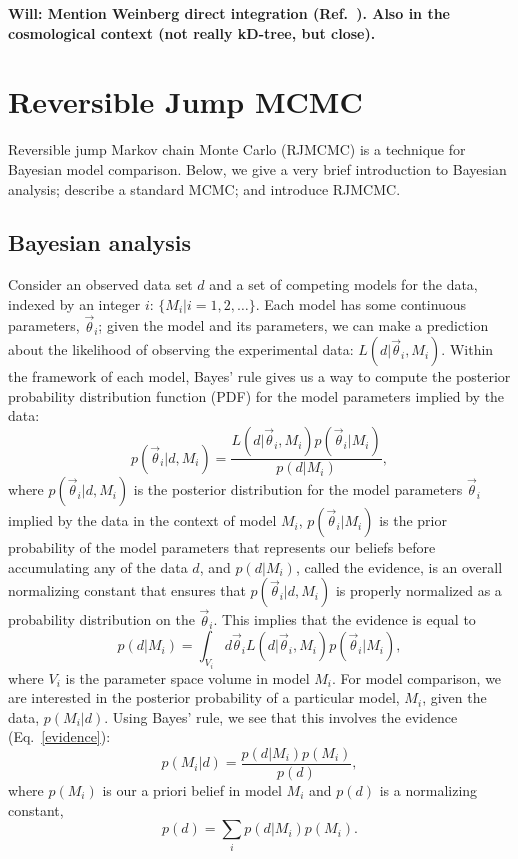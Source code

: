 \documentclass[prd,preprint]{revtex4}
\newcommand{\vtheta}{\vec{\theta}}
\newcommand{\be}{\begin{equation}}
\newcommand{\ee}{\end{equation}}
\newcommand{\bel}[1]{\begin{equation}\label{#1}}
\newcommand{\will}[1]{{\color{blue} \bf Will: #1}}
\begin{document}
\will{Mention Weinberg direct integration (Ref.~\cite{Weinberg2009}).
  Also \cite{Ascasibar2005} in the cosmological context (not really
  kD-tree, but close).}

\section{Reversible Jump MCMC}

Reversible jump Markov chain Monte Carlo (RJMCMC) \cite{Green1995} is a technique for Bayesian model comparison.  Below, we give a very brief introduction to Bayesian analysis; describe a standard MCMC; and introduce RJMCMC.

\subsection{Bayesian analysis}

Consider an observed data set $d$ and a set of competing models for
the data, indexed by an integer $i$: $\{M_i | i = 1, 2, \ldots \}$.
Each model has some continuous parameters, $\vtheta_i$; given the
model and its parameters, we can make a prediction about the
likelihood of observing the experimental data: $L(d|\vtheta_i, M_i)$.
Within the framework of each model, Bayes' rule gives us a way to
compute the posterior probability distribution function (PDF) for the
model parameters implied by the data:
\be
  p(\vtheta_i | d, M_i) = \frac{L(d|\vtheta_i, M_i) p(\vtheta_i|M_i)}{p(d|M_i)},
\ee
where $p(\vtheta_i |d, M_i)$ is the posterior distribution for the
model parameters $\vtheta_i$ implied by the data in the context of
model $M_i$, $p(\vtheta_i|M_i)$ is the prior probability of the model
parameters that represents our beliefs before accumulating any of the
data $d$, and $p(d|M_i)$, called the evidence, is an overall
normalizing constant that ensures that $p(\vtheta_i|d,M_i)$ is
properly normalized as a probability distribution on the $\vtheta_i$.
This implies that the evidence is equal to
\bel{evidence}
  p(d|M_i) = \int_{V_i} d\vtheta_i L(d|\vtheta_i, M_i) p(\vtheta_i|M_i),
\ee
where $V_i$ is the parameter space volume in model $M_i$.  For model
comparison, we are interested in the posterior probability of a
particular model, $M_i$, given the data, $p(M_i|d)$.  Using Bayes'
rule, we see that this involves the evidence (Eq.~\eqref{evidence}):
\be
p(M_i|d) = \frac{p(d|M_i) p(M_i)}{p(d)},
\ee
where $p(M_i)$ is our a priori belief in model $M_i$ and $p(d)$ is a
normalizing constant,
\be
p(d)=\sum_i p(d|M_i) p(M_i).
\ee
\end{document}
